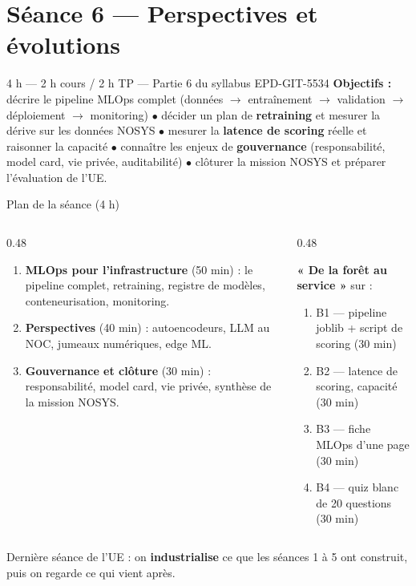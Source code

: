 \section{Séance 6 --- Perspectives et évolutions}
{4 h --- 2 h cours / 2 h TP --- Partie 6 du syllabus EPD-GIT-5534}
{\textbf{Objectifs :} décrire le pipeline MLOps complet (données $\rightarrow$
entraînement $\rightarrow$ validation $\rightarrow$ déploiement $\rightarrow$
monitoring) $\bullet$ décider un plan de \textbf{retraining} et mesurer la
dérive sur les données NOSYS $\bullet$ mesurer la \textbf{latence de scoring}
réelle et raisonner la capacité $\bullet$ connaître les enjeux de
\textbf{gouvernance} (responsabilité, model card, vie privée, auditabilité)
$\bullet$ clôturer la mission NOSYS et préparer l'évaluation de l'UE.}

\begin{frame}{Plan de la séance (4 h)}
\footnotesize%
\begin{columns}[t]
\begin{column}{0.48\textwidth}
\begin{kbox}
\begin{enumerate}
\item \textbf{MLOps pour l'infrastructure} (50 min) : le pipeline complet,
retraining, registre de modèles, conteneurisation, monitoring.
\item \textbf{Perspectives} (40 min) : autoencodeurs, LLM au NOC, jumeaux
numériques, edge ML.
\item \textbf{Gouvernance et clôture} (30 min) : responsabilité, model card,
vie privée, synthèse de la mission NOSYS.
\end{enumerate}
\end{kbox}
\end{column}
\begin{column}{0.48\textwidth}
\begin{ebox}
\small\textbf{« De la forêt au service »} sur  :
\begin{enumerate}
\item B1 --- pipeline joblib + script de scoring (30 min)
\item B2 --- latence de scoring, capacité (30 min)
\item B3 --- fiche MLOps d'une page (30 min)
\item B4 --- quiz blanc de 20 questions (30 min)
\end{enumerate}
\end{ebox}
\end{column}
\end{columns}
\vspace{1mm}
\begin{center}\small
Dernière séance de l'UE : on \textbf{industrialise} ce que les séances 1 à 5
ont construit, puis on regarde ce qui vient après.
\end{center}
\end{frame}


